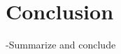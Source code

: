 \documentclass[11pt]{article}
\begin{document}
\section{Conclusion}
-Summarize and conclude


\end{document}
